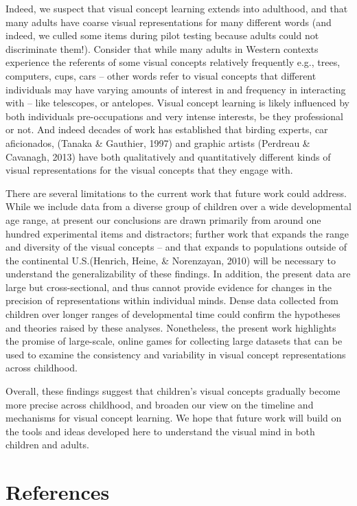\documentclass[
  man,mask]{apa6}
\begin{document}
Indeed, we suspect that visual concept learning extends into adulthood, and that many adults have coarse visual representations for many different words (and indeed, we culled some items during pilot testing because adults could not discriminate them!). Consider that while many adults in Western contexts experience the referents of some visual concepts relatively frequently e.g., trees, computers, cups, cars -- other words refer to visual concepts that different individuals may have varying amounts of interest in and frequency in interacting with -- like telescopes, or antelopes. Visual concept learning is likely influenced by both individuals pre-occupations and very intense interests, be they professional or not. And indeed decades of work has established that birding experts, car aficionados, (Tanaka \& Gauthier, 1997) and graphic artists (Perdreau \& Cavanagh, 2013) have both qualitatively and quantitatively different kinds of visual representations for the visual concepts that they engage with.

There are several limitations to the current work that future work could address. While we include data from a diverse group of children over a wide developmental age range, at present our conclusions are drawn primarily from around one hundred experimental items and distractors; further work that expands the range and diversity of the visual concepts -- and that expands to populations outside of the continental U.S.(Henrich, Heine, \& Norenzayan, 2010) will be necessary to understand the generalizability of these findings. In addition, the present data are large but cross-sectional, and thus cannot provide evidence for changes in the precision of representations within individual minds. Dense data collected from children over longer ranges of developmental time could confirm the hypotheses and theories raised by these analyses. Nonetheless, the present work highlights the promise of large-scale, online games for collecting large datasets that can be used to examine the consistency and variability in visual concept representations across childhood.

Overall, these findings suggest that children's visual concepts gradually become more precise across childhood, and broaden our view on the timeline and mechanisms for visual concept learning. We hope that future work will build on the tools and ideas developed here to understand the visual mind in both children and adults.

\newpage

\section{References}\label{references}
\end{document}
